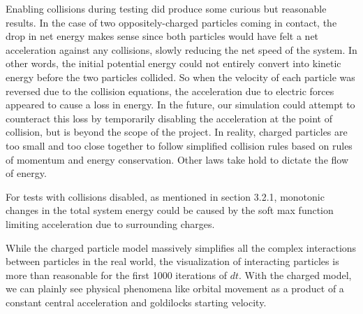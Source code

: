 \documentclass{article}
\begin{document}
Enabling collisions during testing did produce some curious but reasonable results.
In the case of two oppositely-charged particles coming in contact,
the drop in net energy makes sense since both particles
would have felt a net acceleration against any collisions, slowly reducing the net speed of the system.
In other words, the initial potential energy could not entirely convert into kinetic energy
before the two particles collided. So when the velocity of each particle was reversed due to the collision equations,
the acceleration due to electric forces appeared to cause a loss in energy.
In the future, our simulation could attempt to counteract this loss
by temporarily disabling the acceleration at the point of collision,
but is beyond the scope of the project.
In reality, charged particles are too small and too close together
to follow simplified collision rules based on rules of momentum and energy conservation.
Other laws take hold to dictate the flow of energy.

For tests with collisions disabled, as mentioned in section 3.2.1,
monotonic changes in the total system energy could be caused
by the soft max function limiting acceleration due to surrounding charges.

While the charged particle model massively simplifies all the complex interactions between particles in the real world,
the visualization of interacting particles is more than reasonable for the first 1000 iterations of $dt$.
With the charged model, we can plainly see physical phenomena like orbital movement as a product of a constant central acceleration
and goldilocks starting velocity.
\end{document}
